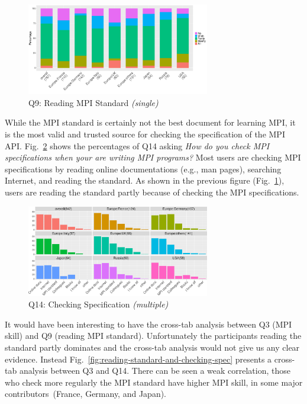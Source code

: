 \documentclass[preprint,5p,times]{elsarticle}
\def\myquote#1{{\it #1}}
\def\mcountries{major contributors\xspace{}}%
\begin{document}
\begin{figure}[htb]
\begin{center}
\includegraphics[width=8.0cm]{R-scripts/Q9.pdf}
\vspace{-2mm}
\caption{Q9: Reading MPI Standard {\it(single)}}
\label{fig:reading-standard}
\end{center}
\end{figure}

While the MPI standard is certainly not the best document for learning MPI, it
is the most valid and trusted source for checking the specification of the MPI
API. Fig.~\ref{fig:checking-spec} shows the percentages of Q14 asking
\myquote{How do you check MPI specifications when your are writing MPI
programs?} Most users are checking MPI specifications by reading online
documentations (e.g., man pages), searching Internet, and reading the standard.
As shown in the previous figure (Fig.~\ref{fig:reading-standard}), users are
reading the standard partly because of checking the MPI specifications.

\begin{figure}[htb]
\begin{center}
\includegraphics[width=8.0cm]{R-scripts/Q14.pdf}
\vspace{-2mm}
\caption{Q14: Checking Specification {\it(multiple)}}
\label{fig:checking-spec}
\end{center}
\end{figure}

It would have been interesting to have the cross-tab analysis between Q3 (MPI
skill) and Q9 (reading MPI standard). Unfortunately the participants reading the
standard partly dominates and the cross-tab analysis would not give us any clear
evidence.
%
Instead Fig.~\ref{fig:reading-standard-and-checking-spec} presents a cross-tab
analysis between Q3 and Q14. There can be seen a weak correlation, those who
check more regularly the MPI standard have higher MPI skill, in some
\mcountries\  (France, Germany, and Japan).
\end{document}
